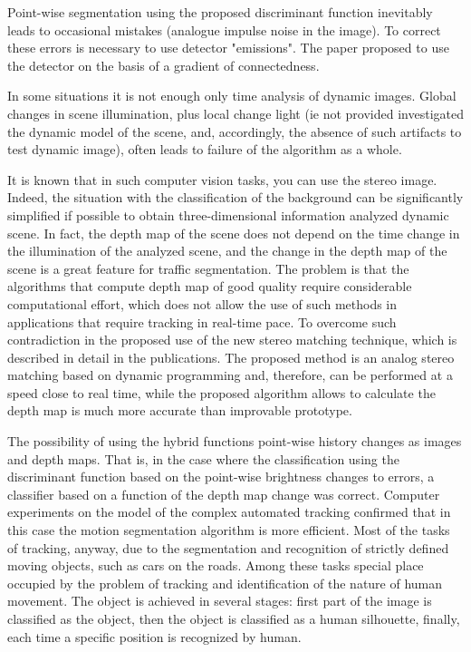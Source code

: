 Point-wise segmentation using the proposed discriminant function inevitably leads to occasional mistakes (analogue impulse noise in the image). To correct these errors is necessary to use detector "emissions". The paper proposed to use the detector on the basis of a gradient of connectedness.

In some situations it is not enough only time analysis of dynamic images. Global changes in scene illumination, plus local change light (ie not provided investigated the dynamic model of the scene, and, accordingly, the absence of such artifacts to test dynamic image), often leads to failure of the algorithm as a whole.

It is known that in such computer vision tasks, you can use the stereo image. Indeed, the situation with the classification of the background can be significantly simplified if possible to obtain three-dimensional information analyzed dynamic scene. In fact, the depth map of the scene does not depend on the time change in the illumination of the analyzed scene, and the change in the depth map of the scene is a great feature for traffic segmentation.
The problem is that the algorithms that compute depth map of good quality require considerable computational effort, which does not allow the use of such methods in applications that require tracking in real-time pace. To overcome such contradiction in the proposed use of the new stereo matching technique, which is described in detail in the publications. The proposed method is an analog stereo matching based on dynamic programming and, therefore, can be performed at a speed close to real time, while the proposed algorithm allows to calculate the depth map is much more accurate than improvable prototype.

The possibility of using the hybrid functions point-wise history changes as images and depth maps. That is, in the case where the classification using the discriminant function based on the point-wise brightness changes to errors, a classifier based on a function of the depth map change was correct. Computer experiments on the model of the complex automated tracking confirmed that in this case the motion segmentation algorithm is more efficient.
Most of the tasks of tracking, anyway, due to the segmentation and recognition of strictly defined moving objects, such as cars on the roads. Among these tasks special place occupied by the problem of tracking and identification of the nature of human movement. The object is achieved in several stages: first part of the image is classified as the object, then the object is classified as a human silhouette, finally, each time a specific position is recognized by human.

